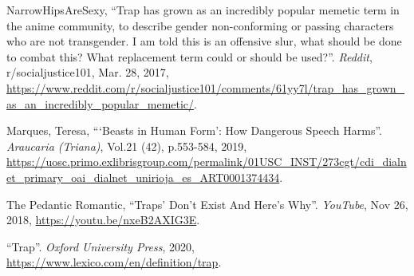 \documentclass[12pt, letterpaper]{article}
\begin{document}
\begin{mla}
\begin{workscited}
	\bibent NarrowHipsAreSexy, ``Trap has grown as an incredibly popular
	memetic term in the anime community, to describe gender non-conforming
	or passing characters who are not transgender. I am told this is an
	offensive slur, what should be done to combat this? What replacement term
	could or should be used?''.
	\textit{Reddit}, r/socialjustice101, Mar. 28, 2017,
	\url{https://www.reddit.com/r/socialjustice101/comments/61yy7l/trap_has_grown_as_an_incredibly_popular_memetic/}.
	
	\bibent Marques, Teresa, ```Beasts in Human Form': How Dangerous Speech Harms''.
	\textit{Araucaria (Triana)}, Vol.21 (42), p.553-584, 2019,
	\url{https://uosc.primo.exlibrisgroup.com/permalink/01USC_INST/273cgt/cdi_dialnet_primary_oai_dialnet_unirioja_es_ART0001374434}.
	
	\bibent The Pedantic Romantic, ``Traps' Don't Exist And Here's Why''.
	\textit{YouTube}, Nov 26, 2018,
	\url{https://youtu.be/nxeB2AXIG3E}.
	
	\bibent ``Trap''.
	\textit{Oxford University Press}, 2020,
	\url{https://www.lexico.com/en/definition/trap}.
	
\end{workscited}


\end{mla}
\end{document}

